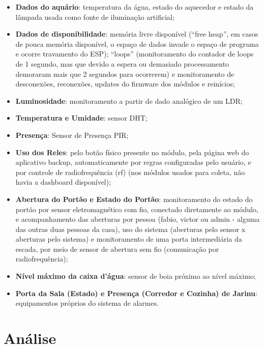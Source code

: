\begin{itemize}
	\item \textbf{Dados do aquário}: temperatura da água, estado do aquecedor e estado da lâmpada usada como fonte de iluminação artificial;
	\item \textbf{Dados de disponibilidade}: memória livre disponível (“free heap”, em casos de pouca memória disponível, o espaço de dados invade o espaço de programa e ocorre travamento do ESP); “loops” (monitoramento do contador de loops de 1 segundo, mas que devido a espera ou demasiado processamento demoraram mais que 2 segundos para ocorrerem) e monitoramento de desconexões, reconexões, updates do firmware dos módulos e reinícios;
	\item \textbf{Luminosidade}: monitoramento a partir de dado analógico de um LDR;
	\item \textbf{Temperatura e Umidade}: sensor DHT;
	\item \textbf{Presença}: Sensor de Presença PIR;
	\item \textbf{Uso dos Reles}: pelo botão físico presente no módulo, pela página web do aplicativo backup, automaticamente por regras configuradas pelo usuário, e por controle de radiofrequência (rf) (nos módulos usados para coleta, não havia a dashboard disponível);
	\item \textbf{Abertura do Portão e Estado do Portão}: monitoramento do estado do portão por sensor eletromagnético com fio, conectado diretamente ao módulo, e acompanhamento das aberturas por pessoa (fabio, victor ou admin - alguma das outras duas pessoas da casa), uso do sistema (aberturas pelo sensor x aberturas pelo sistema) e monitoramento de uma porta intermediária da escada, por meio de sensor de abertura sem fio (comunicação por radiofrequência);
	\item \textbf{Nível máximo da caixa d’água}: sensor de boia próximo ao nível máximo;
	\item \textbf{Porta da Sala (Estado) e Presença (Corredor e Cozinha) de Jarinu}: equipamentos próprios do sistema de alarmes.

\end{itemize}

\section{Análise}

